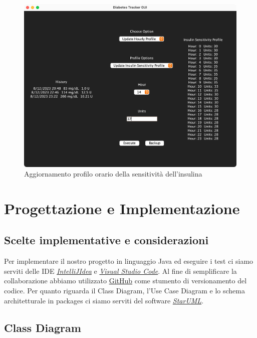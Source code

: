 \documentclass[twocolumn]{article}
\begin{document}
\begin{figure}[!htbp]
    \centering
    \includegraphics[width=14cm]{gui-insens.png}
    \caption{Aggiornamento profilo orario della sensitività dell'insulina}
    \label{fig:gui-insens}
\end{figure}


\section{Progettazione e Implementazione} 

\subsection{Scelte implementative e considerazioni}
Per implementare il nostro progetto in linguaggio Java ed eseguire i test ci siamo serviti delle IDE \href{https://www.jetbrains.com/idea/}{\textit{IntelliJIdea}} e \href{https://code.visualstudio.com/}{\textit{Visual Studio Code}}. Al fine di semplificare la collaborazione abbiamo utilizzato \href{https://github.com/federicomarra/swe-diab}{GitHub} come stumento di versionamento del codice. Per quanto riguarda il Class Diagram, l’Use Case Diagram e lo schema architetturale in packages ci siamo serviti del software \href{https://staruml.io/}{\textit{StarUML}}.

\subsection{Class Diagram}
\end{document}
